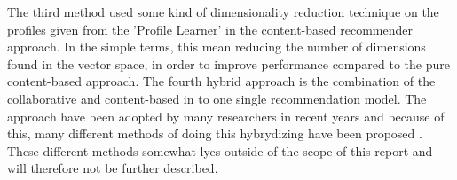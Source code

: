The third method used some kind of dimensionality reduction technique on the profiles given from the 'Profile Learner' in the content-based recommender approach. In the simple terms, this mean reducing the number of dimensions found in the vector space, in order to improve performance compared to the pure content-based approach. \newline
The fourth hybrid approach is the combination of the collaborative and content-based in to one single recommendation model. The approach have been adopted by many researchers in recent years and because of this, many different methods of doing this hybrydizing have been proposed \citep[p. 22]{TowardsTheNextGenerationOfRs}. These different methods somewhat lyes outside of the scope of this report and will therefore not be further described. \newline

